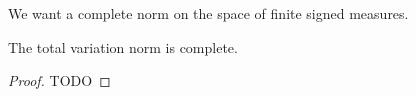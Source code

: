 

We want a complete
norm on the space
of finite signed measures.


\begin{prop}
The
total variation norm
is complete.
\begin{proof}
TODO
\end{proof}
\end{prop}
